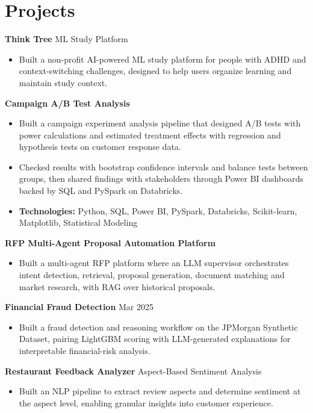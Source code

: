 \documentclass[10pt,a4paper]{article}
\begin{document}
\section{Projects}
\textbf{Think Tree} \textbar{} ML Study Platform\par
\begin{itemize}
  \item Built a non-profit AI-powered ML study platform for people with ADHD and context-switching challenges, designed to help users organize learning and maintain study context.
\end{itemize}
\textbf{Campaign A/B Test Analysis}\par
\begin{itemize}
  \item Built a campaign experiment analysis pipeline that designed A/B tests with power calculations and estimated treatment effects with regression and hypothesis tests on customer response data.
  \item Checked results with bootstrap confidence intervals and balance tests between groups, then shared findings with stakeholders through Power BI dashboards backed by SQL and PySpark on Databricks.
  \item \textbf{Technologies:} Python, SQL, Power BI, PySpark, Databricks, Scikit-learn, Matplotlib, Statistical Modeling
\end{itemize}
\textbf{RFP Multi-Agent Proposal Automation Platform}\par
\begin{itemize}
  \item Built a multi-agent RFP platform where an LLM supervisor orchestrates intent detection, retrieval, proposal generation, document matching and market research, with RAG over historical proposals.
\end{itemize}
\textbf{Financial Fraud Detection} \textbar{} Mar 2025\par
\begin{itemize}
  \item Built a fraud detection and reasoning workflow on the JPMorgan Synthetic Dataset, pairing LightGBM scoring with LLM-generated explanations for interpretable financial-risk analysis.
\end{itemize}
\textbf{Restaurant Feedback Analyzer} \textbar{} Aspect-Based Sentiment Analysis\par
\begin{itemize}
  \item Built an NLP pipeline to extract review aspects and determine sentiment at the aspect level, enabling granular insights into customer experience.
\end{itemize}
\end{document}
